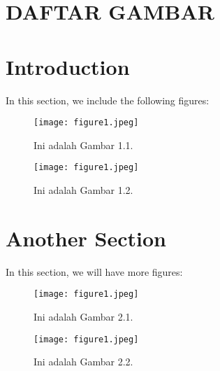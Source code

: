 \documentclass[a4paper, 12pt]{article}
\begin{document}
\section*{DAFTAR GAMBAR}
\vspace{1em}
\renewcommand{\listfigurename}{List of Gambar} %
\listoffigures %

\section{Introduction}

In this section, we include the following figures:

\begin{figure}[h]
\centering
\texttt{[image: figure1.jpeg]}
\caption{Ini adalah Gambar 1.1.}
\label{fig:figure1}
\end{figure}

\begin{figure}[h]
\centering
\texttt{[image: figure1.jpeg]}
\caption{Ini adalah Gambar 1.2.}
\label{fig:figure2}
\end{figure}

\section{Another Section}

In this section, we will have more figures:

\begin{figure}[h]
\centering
\texttt{[image: figure1.jpeg]}
\caption{Ini adalah Gambar 2.1.}
\label{fig:figure3}
\end{figure}

\begin{figure}[h]
\centering
\texttt{[image: figure1.jpeg]}
\caption{Ini adalah Gambar 2.2.}
\label{fig:figure4}
\end{figure}
\end{document}
